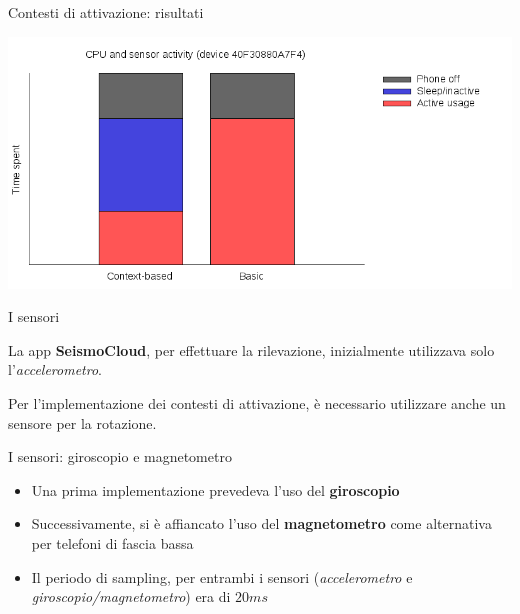 \begin{frame}[t]{Contesti di attivazione: risultati}

\begin{center}
\includegraphics[width=\textwidth]{database/usageplot}
\end{center}

\end{frame}

\begin{frame}[c]{I sensori}

La app \textbf{SeismoCloud}, per effettuare la rilevazione, inizialmente utilizzava solo l'\textit{accelerometro}.

\vspace{1cm}

Per l'implementazione dei contesti di attivazione, è necessario utilizzare anche un sensore per la rotazione.

\end{frame}

\begin{frame}[c]{I sensori: giroscopio e magnetometro}

\begin{itemize}
  \item Una prima implementazione prevedeva l'uso del \textbf{giroscopio}
  \item Successivamente, si è affiancato l'uso del \textbf{magnetometro} come alternativa per telefoni di fascia bassa
  \item Il periodo di sampling, per entrambi i sensori (\textit{accelerometro} e \textit{giroscopio/magnetometro}) era di $20ms$
\end{itemize}

\end{frame}

